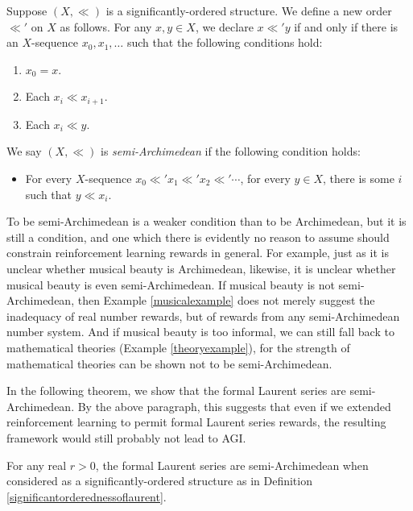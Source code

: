 \documentclass[twoside,11pt]{article}
\begin{document}
\begin{definition}
Suppose $(X,\ll)$ is a significantly-ordered structure.
We define a new order $\ll'$ on $X$ as follows.
For any $x,y\in X$, we declare $x\ll' y$ if and only if there is an $X$-sequence
$x_0,x_1,\ldots$ such that the following conditions hold:
\begin{enumerate}
    \item
    $x_0=x$.
    \item
    Each $x_i\ll x_{i+1}$.
    \item
    Each $x_i\ll y$.
\end{enumerate}
We say $(X,\ll)$ is \emph{semi-Archimedean} if
the following condition holds:
\begin{itemize}
    \item
    For every $X$-sequence $x_0\ll' x_1\ll' x_2\ll' \cdots$,
    for every $y\in X$, there is some $i$
    such that $y\ll x_i$.
\end{itemize}
\end{definition}

To be semi-Archimedean is a weaker condition than to be Archimedean, but it is
still a condition, and one which there is evidently no reason to assume should
constrain reinforcement learning rewards in general.
For example, just as it is unclear whether musical beauty is Archimedean,
likewise, it is unclear whether musical beauty is even semi-Archimedean.
If musical beauty is not semi-Archimedean,
then Example \ref{musicalexample} does not merely suggest the
inadequacy of real number rewards, but of rewards from any semi-Archimedean number
system. And if musical beauty is too informal,
we can still fall back to mathematical theories (Example \ref{theoryexample}),
for the strength of mathematical theories can be shown not to be semi-Archimedean.

In the following theorem, we show that the formal Laurent series are semi-Archimedean.
By the above paragraph, this suggests that even if we extended reinforcement
learning to permit
formal Laurent series rewards, the resulting framework would still probably not lead
to AGI.

\begin{theorem}
\label{tedioustheorem}
For any real $r>0$,
the formal Laurent series are semi-Archimedean when considered as a
significantly-ordered structure as in Definition \ref{significantorderednessoflaurent}.
\end{theorem}
\end{document}
